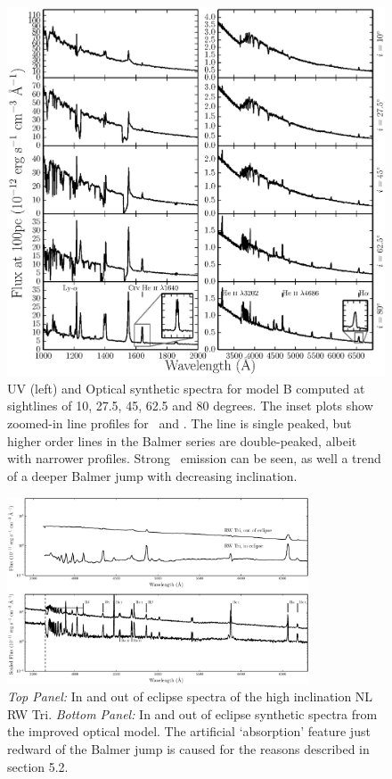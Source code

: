 \documentclass[preprint, a4paper, 11pt]{aastex}
\begin{document}
{\begin{figure} %
\includegraphics[width=\textwidth]{figures/fig14_uv_opt.eps}
\caption{
UV (left) and Optical synthetic spectra for model B computed at
sightlines of 10, 27.5, 45, 62.5 and 80 degrees.	
The inset plots show zoomed-in line profiles for 
\heiiuv\ and \ha. The \ha line 
is single peaked, but higher order lines in the Balmer series
are double-peaked, albeit with narrower profiles.
Strong \heiiopt\ emission can be seen, as well a trend
of a deeper Balmer jump with decreasing inclination.
}
\label{uvoptb}
\end{figure} %


\begin{figure} %
\includegraphics[width=0.8\textwidth]{figures/fig13_eclipse.eps}
\caption{{\sl Top Panel:} In and out of eclipse spectra of the high
inclination NL RW Tri. {\sl Bottom Panel:} In and out of eclipse synthetic
spectra from the improved optical model.
The artificial `absorption' feature just redward of the Balmer jump
is caused for the reasons described in section 5.2.}
\label{rwtricomp}
\end{figure} %


}
\end{document}
